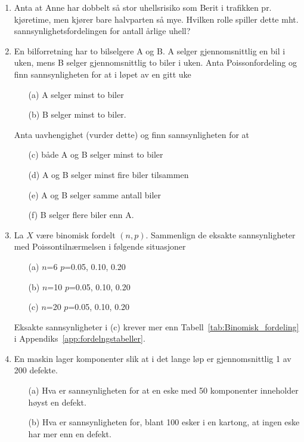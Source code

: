 \begin{enumerate}
\item Anta at Anne har dobbelt så stor uhellsrisiko som Berit i trafikken
     pr. kjøretime, men kjører bare halvparten så mye. Hvilken rolle
     spiller dette mht. sannsynlighetsfordelingen for antall årlige uhell?

\item  En bilforretning har to bilselgere A og B. A selger
     gjennomsnittlig en bil i uken, mens B selger gjennomsnittlig
     to biler i uken. Anta Poissonfordeling og finn
     sannsynligheten for at i løpet av en gitt uke
     \begin{itemize}
     \item[(a)]  A selger minst to biler
     \item[(b)]  B selger minst to biler.
     \end{itemize}
     Anta uavhengighet (vurder dette) og finn sannsynligheten for at
     \begin{itemize}
     \item[(c)]  både A og B selger minst to biler
     \item[(d)]  A og B selger minst fire biler tilsammen
     \item[(e)]  A og B selger samme antall biler
     \item[(f)]  B selger flere biler enn A.
     \end{itemize}

\item  La $X$ være binomisk fordelt $(n,p)$.
     Sammenlign de eksakte sannsynligheter med
     Poissontilnærmelsen i følgende situasjoner
     \begin{itemize}
     \item[(a)]  $n$=6   $p$=0.05, 0.10, 0.20
     \item[(b)]  $n$=10  $p$=0.05, 0.10, 0.20
     \item[(c)]  $n$=20  $p$=0.05, 0.10, 0.20
     \end{itemize}
     Eksakte sannsynligheter i (c) krever mer enn Tabell~\ref{tab:Binomisk_fordeling} i Appendiks~\ref{app:fordelngstabeller}.

\item  En maskin lager komponenter slik at i det lange løp er
     gjennomsnittlig 1 av 200 defekte.
     \begin{itemize}
     \item[(a)]  Hva er sannsynligheten for at en eske med 50 komponenter
        inneholder høyst en defekt.
     \item[(b)]  Hva er sannsynligheten for, blant 100 esker i en
          kartong, at ingen eske har mer enn en defekt.
     \end{itemize}


\end{enumerate}
